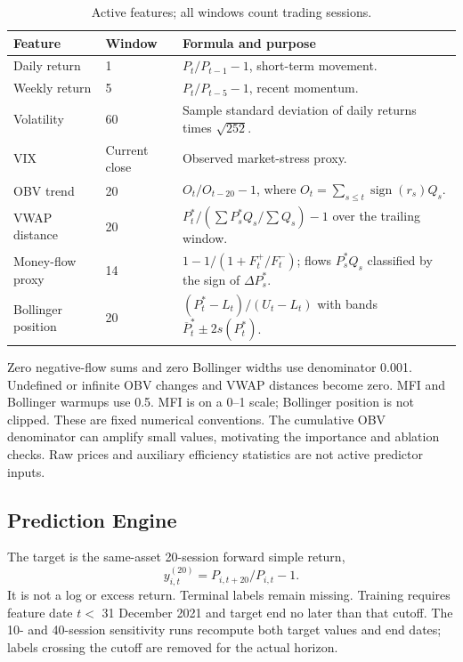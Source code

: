 \documentclass[3p,times]{elsarticle}
\begin{document}
\begin{table}[htbp]\centering\small
\caption{Active features; all windows count trading sessions.}\label{tab:features}
\begin{tabularx}{\textwidth}{llX}\toprule
Feature & Window & Formula and purpose \\\midrule
Daily return & 1 & $P_t/P_{t-1}-1$, short-term movement. \\
Weekly return & 5 & $P_t/P_{t-5}-1$, recent momentum. \\
Volatility & 60 & Sample standard deviation of daily returns times $\sqrt{252}$. \\
VIX & Current close & Observed market-stress proxy. \\
OBV trend & 20 & $O_t/O_{t-20}-1$, where $O_t=\sum_{s\le t}\operatorname{sign}(r_s)Q_s$. \\
VWAP distance & 20 & $P_t^*/(\sum P_s^*Q_s/\sum Q_s)-1$ over the trailing window. \\
Money-flow proxy & 14 & $1-1/(1+F_t^+/F_t^-)$; flows $P_s^*Q_s$ classified by the sign of $\Delta P_s^*$. \\
Bollinger position & 20 & $(P_t^*-L_t)/(U_t-L_t)$ with bands $\overline P_t^*\pm2s(P_t^*)$. \\\bottomrule
\end{tabularx}\end{table}

Zero negative-flow sums and zero Bollinger widths use denominator 0.001. Undefined or infinite OBV changes and VWAP distances become zero. MFI and Bollinger warmups use 0.5. MFI is on a 0--1 scale; Bollinger position is not clipped. These are fixed numerical conventions. The cumulative OBV denominator can amplify small values, motivating the importance and ablation checks. Raw prices and auxiliary efficiency statistics are not active predictor inputs.

\subsection{Prediction Engine}
The target is the same-asset 20-session forward simple return,
\begin{equation}y_{i,t}^{(20)}=P_{i,t+20}/P_{i,t}-1.\end{equation}
It is not a log or excess return. Terminal labels remain missing. Training requires feature date $t<$ 31 December 2021 and target end no later than that cutoff. The 10- and 40-session sensitivity runs recompute both target values and end dates; labels crossing the cutoff are removed for the actual horizon.
\end{document}
